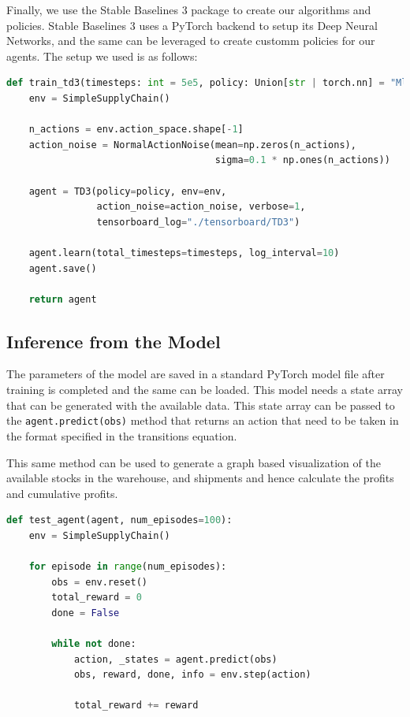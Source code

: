 \documentclass{article}
\begin{document}
Finally, we use the Stable Baselines 3 package to create our algorithms and policies. Stable Baselines 3 uses a PyTorch backend to setup its Deep Neural Networks, and the same can be leveraged to create customm policies for our agents. The setup we used is as follows:

\begin{lstlisting}[language=Python]
def train_td3(timesteps: int = 5e5, policy: Union[str | torch.nn] = "MlpPolicy"):
    env = SimpleSupplyChain()

    n_actions = env.action_space.shape[-1]
    action_noise = NormalActionNoise(mean=np.zeros(n_actions), 
                                     sigma=0.1 * np.ones(n_actions))

    agent = TD3(policy=policy, env=env,
                action_noise=action_noise, verbose=1, 
                tensorboard_log="./tensorboard/TD3")

    agent.learn(total_timesteps=timesteps, log_interval=10)
    agent.save()

    return agent
\end{lstlisting}

\subsection{Inference from the Model}
The parameters of the model are saved in a standard PyTorch model file after training is completed and the same can be loaded. This model needs a state array that can be generated with the available data. This state array can be passed to the \lstinline{agent.predict(obs)} method that returns an action that need to be taken in the format specified in the transitions equation.

This same method can be used to generate a graph based visualization of the available stocks in the warehouse, and shipments and hence calculate the profits and cumulative profits.

\begin{lstlisting}[language=Python]
def test_agent(agent, num_episodes=100):
    env = SimpleSupplyChain()

    for episode in range(num_episodes):
        obs = env.reset()
        total_reward = 0
        done = False

        while not done:
            action, _states = agent.predict(obs)
            obs, reward, done, info = env.step(action)

            total_reward += reward
\end{lstlisting}
\end{document}
